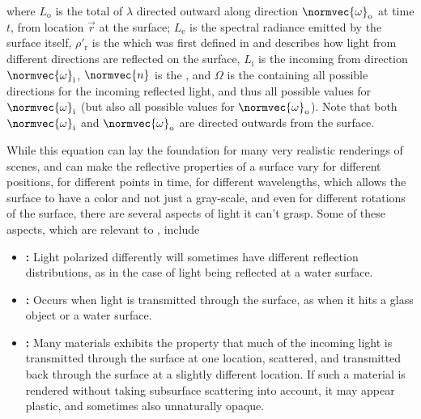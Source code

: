 {where $L_{\text{o}}$ is the total  of  $\lambda$ directed outward along direction $\normvec{\omega}_{\text{o}}$ at time $t$, from location $\vec{r}$ at the surface; $L_{\text{e}}$ is the spectral radiance emitted by the surface itself, $\rho'_{\text{r}}$ is the \BRDF which was first defined in \citep{temp} and describes how light from different directions are reflected on the surface, $L_{\text{i}}$ is the  incoming from direction $\normvec{\omega}_{\text{i}}$, $\normvec{n}$ is the , and $\Omega$ is the  containing all possible directions for the incoming reflected light, and thus all possible values for $\normvec{\omega}_{\text{i}}$ (but also all possible values for $\normvec{\omega}_{\text{o}}$). Note that both $\normvec{\omega}_{\text{i}}$ and $\normvec{\omega}_{\text{o}}$ are directed outwards from the surface.

While this equation can lay the foundation for many very realistic renderings of \threedimensional scenes, and can make the reflective properties of a surface vary for different positions, for different points in time, for different wavelengths, which allows the surface to have a color and not just a gray-scale, and even for different rotations of the surface, there are several aspects of light it can't grasp. Some of these aspects, which are relevant to \surfacewaterrendering, include

\begin{itemize}
\item \textbf{:} Light polarized differently will sometimes have different reflection distributions, as in the case of light being reflected at a water surface.

\item \textbf{:} Occurs when light is transmitted through the surface, as when it hits a glass object or a water surface.

\item \textbf{:} Many materials exhibits the property that much of the incoming light is transmitted through the surface at one location, scattered, and transmitted back through the surface at a slightly different location. If such a material is rendered without taking subsurface scattering into account, it may appear plastic, and sometimes also unnaturally opaque.


\end{itemize}}
